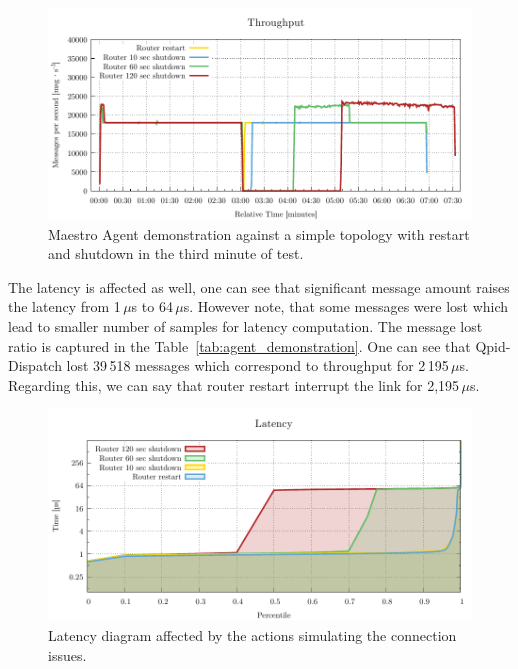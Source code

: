 \begin{figure}[H]
	\centering
	\includegraphics[width=1\linewidth]{obrazky-figures/charts/agent-throughput.pdf}
	\caption{Maestro Agent demonstration against a simple topology with restart and shutdown in the third minute of test.}
	\label{fig:agent-throughput}
\end{figure}

The latency is affected as well, one can see that significant message amount raises the latency from 1\,$\mu$s to 64\,$\mu$s. However note, that some messages were lost which lead to smaller number of samples for latency computation. The message lost ratio is captured in the Table~\ref{tab:agent_demonstration}. One can see that Qpid-Dispatch lost 39\,518 messages which correspond to throughput for 2\,195\,$\mu$s. Regarding this, we can say that router restart interrupt the link for 2,195\,$\mu$s.

\begin{figure}[H]
	\centering
	\includegraphics[width=1\linewidth]{obrazky-figures/charts/agent-latency.pdf}
	\caption{Latency diagram affected by the actions simulating the connection issues.}
	\label{fig:agent-latency}
\end{figure}

